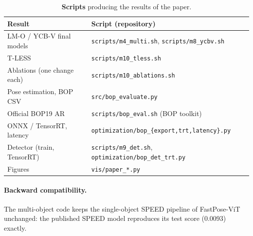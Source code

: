 \begin{table}[h]
  \centering
  \footnotesize
  \begin{tabular}{ll}
    \toprule
    Result & Script (repository) \\
    \midrule
    LM-O / YCB-V final models & \texttt{scripts/m4\_multi.sh}, \texttt{scripts/m8\_ycbv.sh} \\
    T-LESS & \texttt{scripts/m10\_tless.sh} \\
    Ablations (one change each) & \texttt{scripts/m10\_ablations.sh} \\
    Pose estimation, BOP CSV & \texttt{src/bop\_evaluate.py} \\
    Official BOP19 AR & \texttt{scripts/bop\_eval.sh} (BOP toolkit) \\
    ONNX / TensorRT, latency & \texttt{optimization/bop\_\{export,trt,latency\}.py} \\
    Detector (train, TensorRT) & \texttt{scripts/m9\_det.sh}, \texttt{optimization/bop\_det\_trt.py} \\
    Figures & \texttt{vis/paper\_*.py} \\
    \bottomrule
  \end{tabular}
  \caption{\textbf{Scripts} producing the results of the paper.}
  \label{tab:supp:repro}
\end{table}

\paragraph{Backward compatibility.}
The multi-object code keeps the single-object SPEED pipeline of FastPose-ViT unchanged: the
published SPEED model reproduces its test score (0.0093) exactly.

